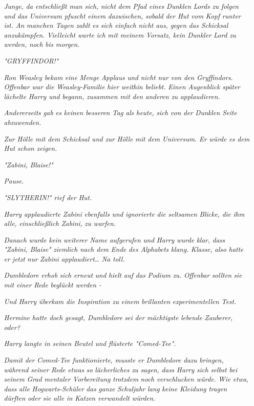 {\emph{\emph{Junge, da entschließt man sich, nicht dem Pfad eines Dunklen Lords zu folgen und das Universum pfuscht einem dazwischen, sobald der Hut vom}} \emph{\emph{Kopf runter ist. An manchen Tagen zahlt es sich einfach nicht aus, gegen das Schicksal anzukämpfen. Vielleicht warte ich mit meinem Vorsatz, kein Dunkler Lord zu werden, noch bis morgen.}}

\emph{"GRYFFINDOR!"}

\emph{Ron Weasley bekam eine} \emph{\emph{Menge}} \emph{Applaus und nicht nur von den Gryffindors. Offenbar war die Weasley-Familie hier weithin beliebt. Einen Augenblick später lächelte Harry und begann, zusammen mit den anderen zu applaudieren.}

\emph{Andererseits gab es keinen besseren Tag als heute, sich von der Dunklen Seite abzuwenden.}

\emph{Zur Hölle mit dem Schicksal und zur Hölle mit dem Universum. Er würde es dem Hut schon zeigen.}

\emph{"Zabini, Blaise!"}

\emph{Pause.}

\emph{"SLYTHERIN!" rief der Hut.}

\emph{Harry applaudierte Zabini ebenfalls und ignorierte die seltsamen Blicke, die ihm alle, einschließlich Zabini, zu warfen.}

\emph{Danach wurde kein weiterer Name aufgerufen und Harry wurde klar, dass "Zabini, Blaise" ziemlich nach dem Ende des Alphabets klang. Klasse, also hatte er jetzt} \emph{\emph{nur}} \emph{Zabini applaudiert… Na toll.}

\emph{Dumbledore erhob sich erneut und hielt auf das Podium zu. Offenbar sollten} \emph{sie mit einer Rede beglückt werden -}

\emph{Und Harry überkam die Inspiration zu einem} \emph{\emph{brillanten}} \emph{experimentellen Test.}

\emph{Hermine hatte doch gesagt, Dumbledore} \emph{sei} \emph{der mächtigste lebende Zauberer, oder?}

\emph{Harry langte in seinen Beutel und flüsterte "Comed-Tee".}

\emph{Damit der Comed-Tee funktionierte, musste er Dumbledore dazu bringen, während seiner Rede etwas} \emph{\emph{so}} \emph{lächerliches zu sagen, dass Harry sich selbst bei seinem Grad mentaler Vorbereitung} \emph{\emph{trotzdem}} \emph{noch verschlucken würde. Wie etwa, dass alle Hogwarts-Schüler das ganze} \emph{Schuljahr} \emph{lang} \emph{keine Kleidung tragen dürften oder sie alle in Katzen verwandelt würden.}

}
